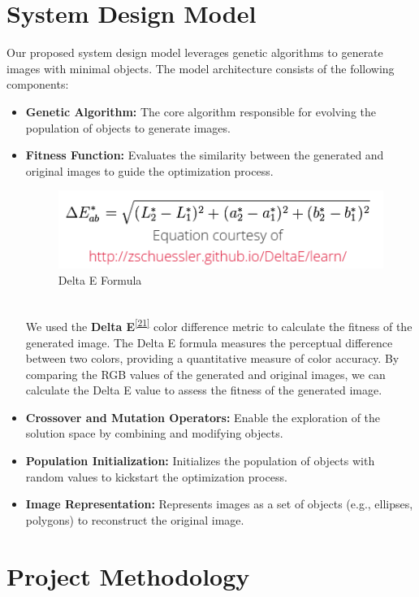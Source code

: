 \documentclass[10pt, conference]{IEEEtran}
\begin{document}
\section{System Design Model}
Our proposed system design model leverages genetic algorithms to generate images with minimal objects. The model architecture consists of the following components:
\begin{itemize}
	\item \textbf{Genetic Algorithm:} The core algorithm responsible for evolving the population of objects to generate images.
	\item \textbf{Fitness Function:} Evaluates the similarity between the generated and original images to guide the optimization process.\\
	      \begin{figure}[h!]
		      \centering
		      \includegraphics[width=0.5\linewidth]{delta_e.png}
		      \caption{Delta E Formula}
	      \end{figure} \\
	      We used the \textbf{Delta E}\hypertarget{ref}{\textsuperscript{\hyperref[sec:21r]{[21]}\label{sec:21}}} color difference metric to calculate the fitness of the generated image. The Delta E formula measures the perceptual difference between two colors, providing a quantitative measure of color accuracy. By comparing the RGB values of the generated and original images, we can calculate the Delta E value to assess the fitness of the generated image.
	\item \textbf{Crossover and Mutation Operators:} Enable the exploration of the solution space by combining and modifying objects.
	\item \textbf{Population Initialization:} Initializes the population of objects with random values to kickstart the optimization process.
	\item \textbf{Image Representation:} Represents images as a set of objects (e.g., ellipses, polygons) to reconstruct the original image.
\end{itemize}

\section{Project Methodology}
\end{document}
